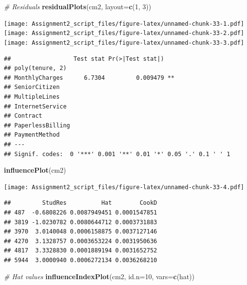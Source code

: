 \documentclass[
]{article}
\newenvironment{Shaded}{\begin{snugshade}}{\end{snugshade}}
\newcommand{\AttributeTok}[1]{\textcolor[rgb]{0.13,0.29,0.53}{#1}}
\newcommand{\CommentTok}[1]{\textcolor[rgb]{0.56,0.35,0.01}{\textit{#1}}}
\newcommand{\DecValTok}[1]{\textcolor[rgb]{0.00,0.00,0.81}{#1}}
\newcommand{\FunctionTok}[1]{\textcolor[rgb]{0.13,0.29,0.53}{\textbf{#1}}}
\newcommand{\NormalTok}[1]{#1}
\newcommand{\StringTok}[1]{\textcolor[rgb]{0.31,0.60,0.02}{#1}}
\begin{document}
\begin{Shaded}
\begin{Highlighting}[]
\CommentTok{\# Residuals}
\FunctionTok{residualPlots}\NormalTok{(cm2, }\AttributeTok{layout=}\FunctionTok{c}\NormalTok{(}\DecValTok{1}\NormalTok{, }\DecValTok{3}\NormalTok{))}
\end{Highlighting}
\end{Shaded}

\texttt{[image: Assignment2\_script\_files/figure-latex/unnamed-chunk-33-1.pdf]}
\texttt{[image: Assignment2\_script\_files/figure-latex/unnamed-chunk-33-2.pdf]}
\texttt{[image: Assignment2\_script\_files/figure-latex/unnamed-chunk-33-3.pdf]}

\begin{verbatim}
##                  Test stat Pr(>|Test stat|)   
## poly(tenure, 2)                               
## MonthlyCharges      6.7304         0.009479 **
## SeniorCitizen                                 
## MultipleLines                                 
## InternetService                               
## Contract                                      
## PaperlessBilling                              
## PaymentMethod                                 
## ---
## Signif. codes:  0 '***' 0.001 '**' 0.01 '*' 0.05 '.' 0.1 ' ' 1
\end{verbatim}

\begin{Shaded}
\begin{Highlighting}[]
\FunctionTok{influencePlot}\NormalTok{(cm2)}
\end{Highlighting}
\end{Shaded}

\texttt{[image: Assignment2\_script\_files/figure-latex/unnamed-chunk-33-4.pdf]}

\begin{verbatim}
##         StudRes          Hat        CookD
## 487  -0.6808226 0.0087949451 0.0001547851
## 3819 -1.0230782 0.0080644712 0.0003731883
## 3970  3.0140048 0.0006158875 0.0037127146
## 4270  3.1328757 0.0003653224 0.0031950636
## 4817  3.3328830 0.0001889194 0.0031652752
## 5944  3.0000940 0.0006272134 0.0036268210
\end{verbatim}

\begin{Shaded}
\begin{Highlighting}[]
\CommentTok{\# Hat values}
\FunctionTok{influenceIndexPlot}\NormalTok{(cm2, }\AttributeTok{id.n=}\DecValTok{10}\NormalTok{, }\AttributeTok{vars=}\FunctionTok{c}\NormalTok{(}\StringTok{\textquotesingle{}hat\textquotesingle{}}\NormalTok{))}
\end{Highlighting}
\end{Shaded}
\end{document}
